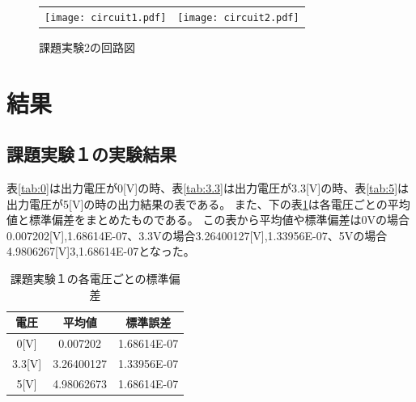 \documentclass[11pt,dvipdfmx]{jarticle}
\begin{document}
				\newpage

				\begin{figure}[b]
					\begin{tabular}{cc}
						\begin{minipage}[c]{0.5\linewidth}
						\centering
						\texttt{[image: circuit1.pdf]}
						\caption{課題実験1の回路図}
						\label{fig:circuit1}
						
					\end{minipage}&
		
					\begin{minipage}[c]{0.5\linewidth}
						\centering
						\texttt{[image: circuit2.pdf]}
						\caption{課題実験2の回路図}
						\label{fig:circuit2}
						
					\end{minipage}

					\end{tabular}


				\end{figure}
					



\section{結果}
	\subsection{課題実験１の実験結果}
		表\ref{tab:0}は出力電圧が0[V]の時、表\ref{tab:3.3}は出力電圧が3.3[V]の時、表\ref{tab:5}は出力電圧が5[V]の時の出力結果の表である。
		また、下の表\ref{tab:hensa}は各電圧ごとの平均値と標準偏差をまとめたものである。
		この表から平均値や標準偏差は0Vの場合0.007202[V],1.68614E-07、3.3Vの場合3.26400127[V],1.33956E-07、5Vの場合4.9806267[V]3,1.68614E-07となった。



		\begin{table}[hbtp]
			\caption{課題実験１の各電圧ごとの標準偏差}
			\centering
			\label{tab:hensa}
			\begin{tabular}{|c|c|c|}
				\hline
				電圧	&	平均値	&	標準誤差\\
				\hline \hline
				0[V]		&0.007202&	1.68614E-07\\
				\hline
				3.3[V]	&3.26400127&	1.33956E-07\\
				\hline
				5[V]		&4.98062673&	1.68614E-07\\
				\hline
			\end{tabular}
		\end{table}
\end{document}
